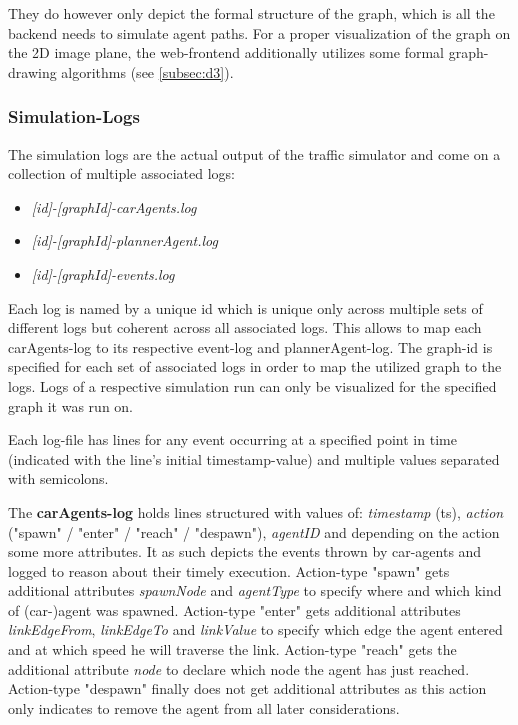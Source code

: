 They do however only depict the formal structure of the graph, which is all the backend needs to simulate agent paths. For a proper visualization of the graph on the 2D image plane, the web-frontend additionally utilizes some formal graph-drawing algorithms (see \autoref{subsec:d3}).

\subsubsection{Simulation-Logs}

The simulation logs are the actual output of the traffic simulator and come on a collection of multiple associated logs: 

\begin{itemize}
    \item \textit{[id]-[graphId]-carAgents.log}
    \item \textit{[id]-[graphId]-plannerAgent.log}
    \item \textit{[id]-[graphId]-events.log}
\end{itemize}

Each log is named by a unique id which is unique only across multiple sets of different logs but coherent across all associated logs. This allows to map each carAgents-log to its respective event-log and plannerAgent-log.
The graph-id is specified for each set of associated logs in order to map the utilized graph to the logs. Logs of a respective simulation run can only be visualized for the specified graph it was run on.

Each log-file has lines for any event occurring at a specified point in time (indicated with the line's initial timestamp-value) and multiple values separated with semicolons.

The \textbf{carAgents-log} holds lines structured with values of: \textit{timestamp} (ts), \textit{action} ("spawn" / "enter" / "reach" / "despawn"), \textit{agentID} and depending on the action some more attributes. It as such depicts the events thrown by car-agents and logged to reason about their timely execution.
Action-type "spawn" gets additional attributes \textit{spawnNode} and \textit{agentType} to specify where and which kind of (car-)agent was spawned. 
Action-type "enter" gets additional attributes \textit{linkEdgeFrom}, \textit{linkEdgeTo} and \textit{linkValue} to specify which edge the agent entered and at which speed he will traverse the link.
Action-type "reach" gets the additional attribute \textit{node} to declare which node the agent has just reached.
Action-type "despawn" finally does not get additional attributes as this action only indicates to remove the agent from all later considerations.

